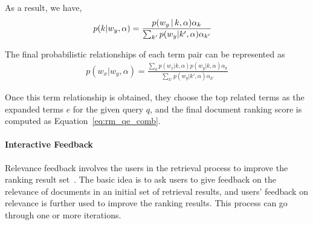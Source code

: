As a result, we have,
\begin{align}
p(k|w_y, \alpha) %
&= \frac{p(w_y \g k,\alpha) \alpha_k}{\sum_{k'} p(w_y|k',\alpha) \alpha_{k'}} \notag
\end{align}

The final probabilistic relationships of each term pair  can be represented as
\begin{align}
p(w_x|w_y, \alpha) = \frac{\sum_k p(w_x|k, \alpha) p(w_y|k,\alpha) \alpha_k }{\sum_{k'} p(w_y|k',\alpha) \alpha_{k'}}
\end{align}

Once this term relationship is obtained, they choose the top related
terms as the expanded terms $e$ for the given query $q$, and the final
document ranking score is computed as Equation~\ref{eq:rm_qe_comb}.

\paragraph{Interactive Feedback}

Relevance feedback involves the users in the retrieval process to improve 
the ranking result set~\citep{Rocchio-1971}. The basic idea is to ask users 
to give feedback on the relevance of documents in an initial set of retrieval 
results, and users' feedback on relevance is further used to improve the 
ranking results. This process can go through one or more iterations.


